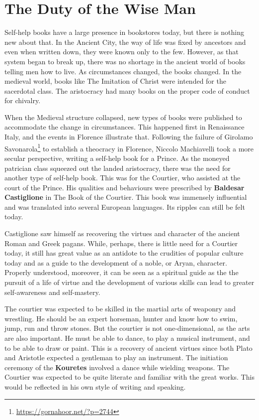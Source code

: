 \section{The Duty of the Wise Man}

Self-help books have a large presence in bookstores today, but there is nothing new about that. In the Ancient City, the way of life was fixed by ancestors and even when written down, they were known only to the few. However, as that system began to break up, there was no shortage in the ancient world of books telling men how to live. As circumstances changed, the books changed. In the medieval world, books like The Imitation of Christ were intended for the sacerdotal class. The aristocracy had many books on the proper code of conduct for chivalry.

When the Medieval structure collapsed, new types of books were published to accommodate the change in circumstances. This happened first in Renaissance Italy, and the events in Florence illustrate that. Following the failure of Girolamo Savonarola\footnote{\url{https://gornahoor.net/?p=2744}} to establish a theocracy in Florence, Niccolo Machiavelli took a more secular perspective, writing a self-help book for a Prince. As the moneyed patrician class squeezed out the landed aristocracy, there was the need for another type of self-help book. This was for the Courtier, who assisted at the court of the Prince. His qualities and behaviours were prescribed by \textbf{Baldesar Castiglione} in The Book of the Courtier. This book was immensely influential and was translated into several European languages. Its ripples can still be felt today.

Castiglione saw himself as recovering the virtues and character of the ancient Roman and Greek pagans. While, perhaps, there is little need for a Courtier today, it still has great value as an antidote to the crudities of popular culture today and as a guide to the development of a noble, or Aryan, character. Properly understood, moreover, it can be seen as a spiritual guide as the the pursuit of a life of virtue and the development of various skills can lead to greater self-awareness and self-mastery.

The courtier was expected to be skilled in the martial arts of weaponry and wrestling. He should be an expert horseman, hunter and know how to swim, jump, run and throw stones. But the courtier is not one-dimensional, as the arts are also important. He must be able to dance, to play a musical instrument, and to be able to draw or paint. This is a recovery of ancient virtues since both Plato and Aristotle expected a gentleman to play an instrument. The initiation ceremony of the \textbf{Kouretes} involved a dance while wielding weapons. The Courtier was expected to be quite literate and familiar with the great works. This would be reflected in his own style of writing and speaking.

